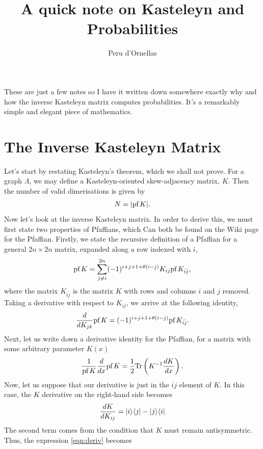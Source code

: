 \documentclass[11pt, oneside]{article} %
\title{A quick note on Kasteleyn and Probabilities}
\author{Peru d'Ornellas}
\numberwithin{equation}{section}
\begin{document}
\maketitle

These are just a few notes so I have it written down somewhere exactly why and how the inverse Kasteleyn matrix computes probabilities. It's a remarkably simple and elegant piece of mathematics.  

\section{The Inverse Kasteleyn Matrix}

Let's start by restating Kasteleyn's theorem, which we shall not prove. For a graph $\Lambda$, we may define a Kasteleyn-oriented  skew-adjacency matrix, $K$. Then the number of valid dimerisations is given by 
\begin{align}
    N = |\textup{pf}\, K|.
\end{align}
Now let's look at the inverse Kasteleyn matrix. In order to derive this, we must first state two properties of Pfaffians, which Can both be found on the Wiki page for the Pfaffian. Firstly, we state the recursive definition of a Pfaffian for a general $2n \times 2n$ matrix, expanded along a row indexed with $i$,
\begin{align}
    \textup{pf}\, K = \sum_{j\neq i}^{2n} (-1)^{i+j+1+\theta(i-j)} K_{ij} \textup{pf}\,{K_{\bar {ij}}},
\end{align}
where the matrix $K_{\bar {ij}}$ is the matrix $K$ with rows and columns $i$ and $j$ removed. Taking a derivative with respect to $K_{ij}$, we arrive at the following identity,
\begin{align}\label{eqn:kij_recursive}
    \frac{d}{d{K_{jk}}} \textup{pf}\, K 
    = (-1)^{i+j+1+\theta(i-j)} \textup{pf}\,{K_{\bar {ij}}}.
\end{align}
Next, let us write down a derivative identity for the Pfaffian, for a matrix with some arbitrary parameter $K(x)$
\begin{align} \label{eqn:deriv}
    \frac{1}{\textup{pf}\, K} \frac d {dx} \textup{pf}\, K = \frac 12 \textup{Tr} \left ( K^{-1} \frac{dK}{dx}\right ).
\end{align}
Now, let us suppose that our derivative is just in the $ij$ element of $K$. In this case, the $K$ derivative on the right-hand side becomes
\begin{align}
    \frac {dK}{dK_{ij}} = \ket{i}\!\bra{j} - \ket{j}\!\bra{i}
\end{align}
The second term comes from the condition that $K$ must remain antisymmetric. Thus, the expression \ref{eqn:deriv} becomes
\end{document}
